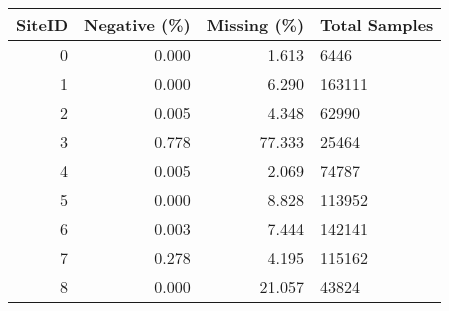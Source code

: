\begin{tabular}{rrrl}
\toprule
 SiteID &  Negative (\%) &  Missing (\%) & Total Samples \\
\midrule
      0 &         0.000 &        1.613 &          6446 \\
      1 &         0.000 &        6.290 &        163111 \\
      2 &         0.005 &        4.348 &         62990 \\
      3 &         0.778 &       77.333 &         25464 \\
      4 &         0.005 &        2.069 &         74787 \\
      5 &         0.000 &        8.828 &        113952 \\
      6 &         0.003 &        7.444 &        142141 \\
      7 &         0.278 &        4.195 &        115162 \\
      8 &         0.000 &       21.057 &         43824 \\
\bottomrule
\end{tabular}
